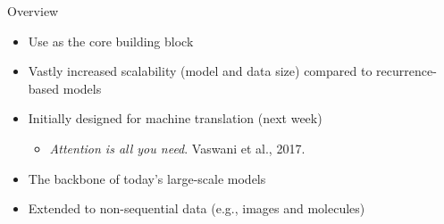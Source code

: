 \documentclass[usenames,dvipsnames,notes,11pt,aspectratio=169,hyperref={colorlinks=true, linkcolor=blue}]{beamer}
\begin{document}
\begin{frame}
    {Overview}
    \begin{itemize}
        \item Use  as the core building block
        \item Vastly increased scalability (model and data size) compared to recurrence-based models
        \item Initially designed for machine translation (next week) 
            \begin{itemize}
                \item \textit{Attention is all you need}. Vaswani et al., 2017.
            \end{itemize}
        \item The backbone of today's large-scale models
        \item Extended to non-sequential data (e.g., images and molecules)
    \end{itemize}
\end{frame}
\end{document}
